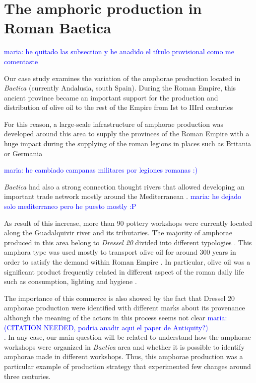 \documentclass[review]{elsarticle}
\newcommand{\memo}[2]{\textcolor{#1}{#2}}
\newcommand{\maria}[1]{\memo{blue}{maria: #1\\}}
\begin{document}
\section{The amphoric production in Roman Baetica}

\maria{he quitado las subsection y he anadido el t\'itulo provisional como me comentaste}

Our case study examines the variation of the amphorae production located in \emph{Baetica} (currently Andalusia, south Spain). During the Roman Empire, this ancient province became an important support for the production and distribution of olive oil to the rest of the Empire from Ist to IIIrd centuries \cite{chic_comercio_2005,millet_anforas_1998, rodriguez_baetican_1998} 



For this reason, a large-scale infrastructure of amphorae production was developed around this area to supply the provinces of the Roman Empire with a huge impact during the supplying of the roman legions in places such as Britania \citep{funari_economic_2005, monfort_britannia_1998} or Germania \citep{remesal_annona_1986} 

\maria{he cambiado campanas militares por legiones romanas :)}

\emph{Baetica} had also a strong connection thought rivers that allowed developing an important trade network mostly around the Mediterranean \citep{garcia_vargas_enrique_formal_2010}. 
\maria{ he dejado solo mediterraneo pero he puesto mostly :P}

As result of this increase, more than 90 pottery workshops were currently located along the Guadalquivir river and its tributaries. The majority of amphorae produced in this area belong to \emph{Dressel 20} divided into different typologies \citep{berni_millet_epigrafianforica_2008, martin-kilcher_romischen_1994}. This amphora type was used mostly to transport olive oil for around 300 years in order to satisfy the demand within Roman Empire \citep{rodriguez_economioleicola_1977}. In particular, olive oil was a significant product frequently related in different aspect of the roman daily life such as consumption, lighting and hygiene \citep{mattingly_d.j._oil_1988}. 


The importance of this commerce is also showed by the fact that Dressel 20 amphorae production were identified with different marks about its provenance although the meaning of the actors in this process seems not clear \maria{(CITATION NEEDED, podria anadir aqui el paper de Antiquity?)}. In any case, our main question will be related to understand how the amphorae workshops were organized in \textit{Baetica} area and whether it is possible to identify amphorae made in different workshops. 
Thus, this amphorae production was a particular example of production strategy that experimented few changes around three centuries.   
\end{document}
